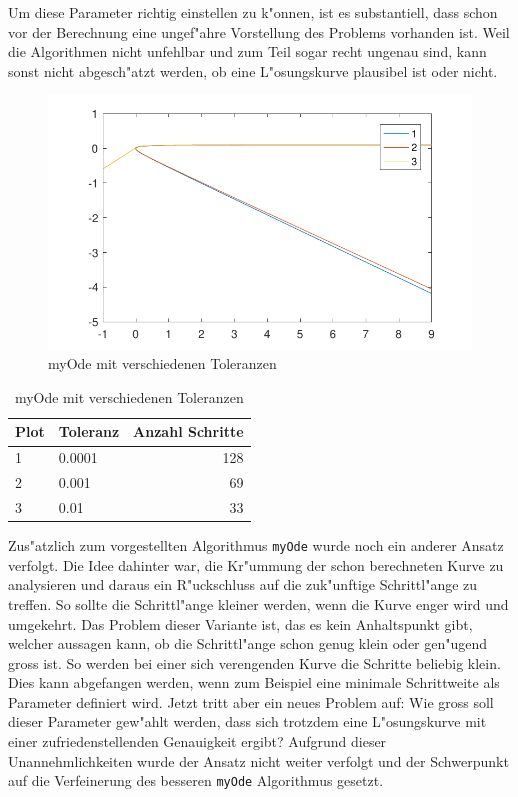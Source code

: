 \begin{refsection}
Um diese Parameter richtig einstellen zu k"onnen, ist es substantiell, dass schon vor der Berechnung eine ungef"ahre Vorstellung des Problems vorhanden ist.
Weil die Algorithmen nicht unfehlbar und zum Teil sogar recht ungenau sind, kann sonst nicht abgesch"atzt werden, ob eine L"osungskurve plausibel ist oder nicht.
\begin{figure}
\centering
\includegraphics{schrittlaenge/images/myOdeToleranz.pdf}
\caption{myOde mit verschiedenen Toleranzen}
\label{image:myOdeToleranz}
\end{figure}
\begin{table}
\centering
\begin{tabular}{|l|l|r|}
\hline
Plot & Toleranz & Anzahl Schritte\\ \hline
1 & 0.0001 & 128\\
2 & 0.001 & 69\\
3 & 0.01 & 33\\
\end{tabular}
\caption{myOde mit verschiedenen Toleranzen}
\label{table:myOdeToleranz}
\end{table}

Zus"atzlich zum vorgestellten Algorithmus \texttt{myOde} wurde noch ein anderer Ansatz verfolgt.
Die Idee dahinter war, die Kr"ummung der schon berechneten Kurve zu analysieren und daraus ein R"uckschluss auf die zuk"unftige Schrittl"ange zu treffen.
So sollte die Schrittl"ange kleiner werden, wenn die Kurve enger wird und umgekehrt.
Das Problem dieser Variante ist, das es kein Anhaltspunkt gibt, welcher aussagen kann, ob die Schrittl"ange schon genug klein oder gen"ugend gross ist.
So werden bei einer sich verengenden Kurve die Schritte beliebig klein. Dies kann abgefangen werden, wenn zum Beispiel eine minimale Schrittweite als Parameter definiert wird.
Jetzt tritt aber ein neues Problem auf: Wie gross soll dieser Parameter gew"ahlt werden, dass sich trotzdem eine L"osungskurve mit einer zufriedenstellenden Genauigkeit ergibt?
Aufgrund dieser Unannehmlichkeiten wurde der Ansatz nicht weiter verfolgt und der Schwerpunkt auf die Verfeinerung des besseren \texttt{myOde} Algorithmus gesetzt.  

\end{refsection}

